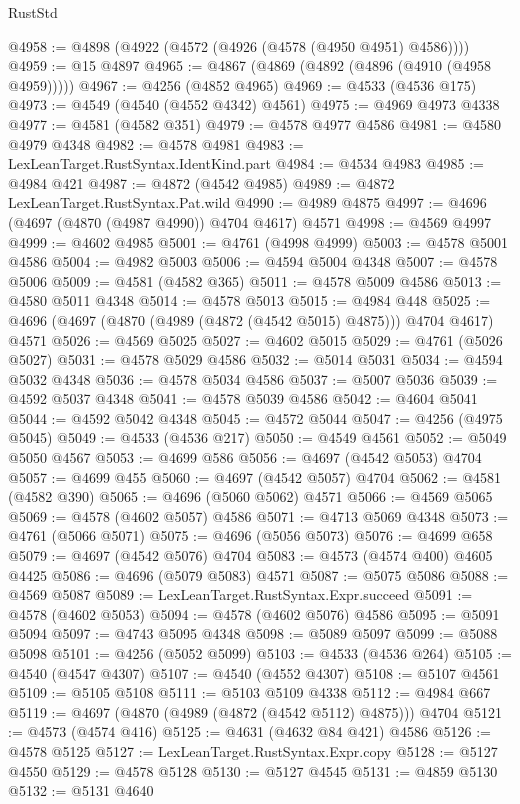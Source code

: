\begin{lexlean}{RustStd}
\begin{coremodule}
@4958 := @4898 (@4922 (@4572 (@4926 (@4578 (@4950 @4951) @4586))))
@4959 := @15 @4897
@4965 := @4867 (@4869 (@4892 (@4896 (@4910 (@4958 @4959)))))
@4967 := @4256 (@4852 @4965)
@4969 := @4533 (@4536 @175)
@4973 := @4549 (@4540 (@4552 @4342) @4561)
@4975 := @4969 @4973 @4338
@4977 := @4581 (@4582 @351)
@4979 := @4578 @4977 @4586
@4981 := @4580 @4979 @4348
@4982 := @4578 @4981
@4983 := LexLeanTarget.RustSyntax.IdentKind.part
@4984 := @4534 @4983
@4985 := @4984 @421
@4987 := @4872 (@4542 @4985)
@4989 := @4872 LexLeanTarget.RustSyntax.Pat.wild
@4990 := @4989 @4875
@4997 := @4696 (@4697 (@4870 (@4987 @4990)) @4704 @4617) @4571
@4998 := @4569 @4997
@4999 := @4602 @4985
@5001 := @4761 (@4998 @4999)
@5003 := @4578 @5001 @4586
@5004 := @4982 @5003
@5006 := @4594 @5004 @4348
@5007 := @4578 @5006
@5009 := @4581 (@4582 @365)
@5011 := @4578 @5009 @4586
@5013 := @4580 @5011 @4348
@5014 := @4578 @5013
@5015 := @4984 @448
@5025 := @4696 (@4697 (@4870 (@4989 (@4872 (@4542 @5015) @4875))) @4704 @4617) @4571
@5026 := @4569 @5025
@5027 := @4602 @5015
@5029 := @4761 (@5026 @5027)
@5031 := @4578 @5029 @4586
@5032 := @5014 @5031
@5034 := @4594 @5032 @4348
@5036 := @4578 @5034 @4586
@5037 := @5007 @5036
@5039 := @4592 @5037 @4348
@5041 := @4578 @5039 @4586
@5042 := @4604 @5041
@5044 := @4592 @5042 @4348
@5045 := @4572 @5044
@5047 := @4256 (@4975 @5045)
@5049 := @4533 (@4536 @217)
@5050 := @4549 @4561
@5052 := @5049 @5050 @4567
@5053 := @4699 @586
@5056 := @4697 (@4542 @5053) @4704
@5057 := @4699 @455
@5060 := @4697 (@4542 @5057) @4704
@5062 := @4581 (@4582 @390)
@5065 := @4696 (@5060 @5062) @4571
@5066 := @4569 @5065
@5069 := @4578 (@4602 @5057) @4586
@5071 := @4713 @5069 @4348
@5073 := @4761 (@5066 @5071)
@5075 := @4696 (@5056 @5073)
@5076 := @4699 @658
@5079 := @4697 (@4542 @5076) @4704
@5083 := @4573 (@4574 @400) @4605 @4425
@5086 := @4696 (@5079 @5083) @4571
@5087 := @5075 @5086
@5088 := @4569 @5087
@5089 := LexLeanTarget.RustSyntax.Expr.succeed
@5091 := @4578 (@4602 @5053)
@5094 := @4578 (@4602 @5076) @4586
@5095 := @5091 @5094
@5097 := @4743 @5095 @4348
@5098 := @5089 @5097
@5099 := @5088 @5098
@5101 := @4256 (@5052 @5099)
@5103 := @4533 (@4536 @264)
@5105 := @4540 (@4547 @4307)
@5107 := @4540 (@4552 @4307)
@5108 := @5107 @4561
@5109 := @5105 @5108
@5111 := @5103 @5109 @4338
@5112 := @4984 @667
@5119 := @4697 (@4870 (@4989 (@4872 (@4542 @5112) @4875))) @4704
@5121 := @4573 (@4574 @416)
@5125 := @4631 (@4632 @84 @421) @4586
@5126 := @4578 @5125
@5127 := LexLeanTarget.RustSyntax.Expr.copy
@5128 := @5127 @4550
@5129 := @4578 @5128
@5130 := @5127 @4545
@5131 := @4859 @5130
@5132 := @5131 @4640

\end{coremodule}
\end{lexlean}
